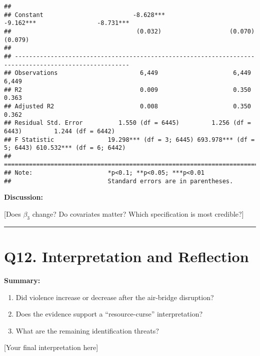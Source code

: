 \documentclass[
]{article}
\providecommand{\tightlist}{%
  \setlength{\itemsep}{0pt}\setlength{\parskip}{0pt}}
\begin{document}
\begin{verbatim}
##                                                                                                       
## Constant                         -8.628***                 -9.162***                 -8.731***        
##                                   (0.032)                   (0.070)                   (0.079)         
##                                                                                                       
## ------------------------------------------------------------------------------------------------------
## Observations                       6,449                     6,449                     6,449          
## R2                                 0.009                     0.350                     0.363          
## Adjusted R2                        0.008                     0.350                     0.362          
## Residual Std. Error          1.550 (df = 6445)         1.256 (df = 6443)         1.244 (df = 6442)    
## F Statistic               19.298*** (df = 3; 6445) 693.978*** (df = 5; 6443) 610.532*** (df = 6; 6442)
## ======================================================================================================
## Note:                     *p<0.1; **p<0.05; ***p<0.01                                                 
##                           Standard errors are in parentheses.
\end{verbatim}

\textbf{Discussion:}

{[}Does \(\beta_3\) change? Do covariates matter? Which specification is
most credible?{]}

\begin{center}\rule{0.5\linewidth}{0.5pt}\end{center}

\section{Q12. Interpretation and
Reflection}\label{q12.-interpretation-and-reflection}

\textbf{Summary:}

\begin{enumerate}
\def\labelenumi{\arabic{enumi}.}
\tightlist
\item
  Did violence increase or decrease after the air-bridge disruption?
\item
  Does the evidence support a ``resource-curse'' interpretation?
\item
  What are the remaining identification threats?
\end{enumerate}

{[}Your final interpretation here{]}
\end{document}
